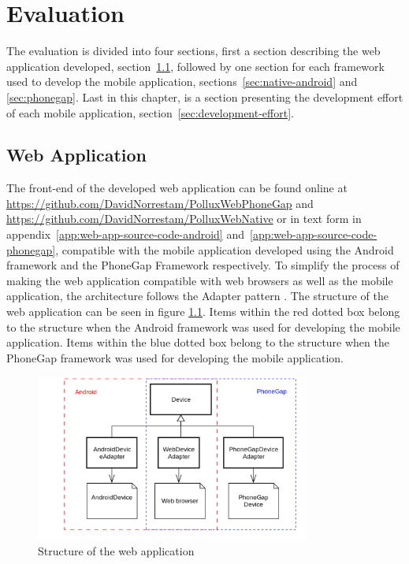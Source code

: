 \chapter{Evaluation}	\label{ch:evaluation}
The evaluation is divided into four sections, first a section describing the web application developed, section~\ref{sec:web-application}, followed by one section for each framework used to develop the mobile application, sections~\ref{sec:native-android} and \ref{sec:phonegap}. Last in this chapter, is a section presenting the development effort of each mobile application, section~\ref{sec:development-effort}.

\section{Web Application}\label{sec:web-application}
The front-end of the developed web application can be found online at \url{https://github.com/DavidNorrestam/PolluxWebPhoneGap} and \url{https://github.com/DavidNorrestam/PolluxWebNative}
or in text form in appendix~\ref{app:web-app-source-code-android} and~\ref{app:web-app-source-code-phonegap}, compatible with the mobile application developed using the Android framework and the PhoneGap Framework respectively.
To simplify the process of making the web application compatible with web browsers as well as the mobile application, the architecture follows the Adapter pattern \cite[p.~317]{martin2003}. The structure of the web application can be seen in figure \ref{fig:webuml}. Items within the red dotted box belong to the structure when the Android framework was used for developing the mobile application. Items within the blue dotted box belong to the structure when the PhoneGap framework was used for developing the mobile application.

\begin{figure}[h!]
	\centering
    \includegraphics[width=90mm,natwidth=600,natheight=450]{./img/webuml.png}
    \caption{Structure of the web application}
	\label{fig:webuml}
\end{figure}

